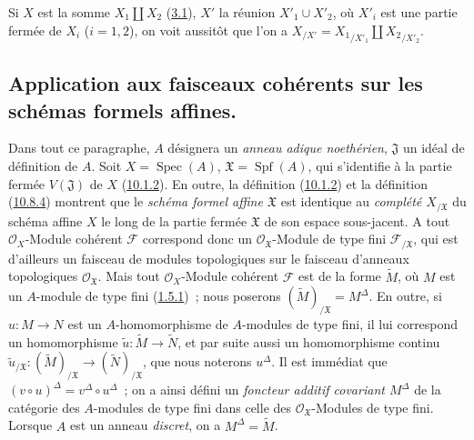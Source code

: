 
\begin{remark}[10.9.10]
\label{I.10.9.10-fr}
Si $X$ est la somme $X_1\amalg X_2$
(\hyperref[subsection:I.3.1-fr]{3.1}), $X'$ la réunion
$X'_1\cup X'_2$, où $X'_i$ est une partie fermée de $X_i$ ($i=1,2$),
on voit aussitôt que l'on a
$X_{/X'}={X_1}_{/X'_1}\amalg {X_2}_{/X'_2}$.
\end{remark}

\subsection{Application aux faisceaux cohérents sur les schémas formels
affines.}
\label{subsection:I.10.10-fr}

\begin{env}[10.10.1]
\label{I.10.10.1-fr}
Dans tout ce paragraphe, $A$ désignera un \emph{anneau adique
noethérien}, $\mathfrak{J}$ un idéal de définition de $A$. Soit
$X=\operatorname{Spec}(A)$, $\mathfrak{X}=\operatorname{Spf}(A)$, qui
s'identifie à la partie fermée $V(\mathfrak{J})$ de $X$
(\hyperref[I.10.1.2-fr]{10.1.2}). En outre, la définition
(\hyperref[I.10.1.2-fr]{10.1.2}) et la définition
(\hyperref[I.10.8.4-fr]{10.8.4}) montrent que le
\emph{schéma formel affine $\mathfrak{X}$} est identique au
\emph{complété $X_{/\mathfrak{X}}$} du schéma affine $X$ le long de la
partie fermée $\mathfrak{X}$ de son espace sous-jacent. A tout
$\mathscr{O}_X$-Module cohérent $\mathscr{F}$ correspond donc un
$\mathscr{O}_{\mathfrak{X}}$-Module de type fini
$\mathscr{F}_{/\mathfrak{X}}$, qui est d'ailleurs un faisceau de modules
topologiques sur le faisceau d'anneaux topologiques
$\mathscr{O}_{\mathfrak{X}}$. Mais tout $\mathscr{O}_X$-Module cohérent
$\mathscr{F}$ est de la forme $\widetilde M$, où $M$ est un $A$-module
de type fini (\hyperref[I.1.5.1-fr]{1.5.1})~; nous poserons
$(\widetilde M)_{/\mathfrak{X}}=M^\Delta$. En outre, si $u:M\to N$ est
un $A$-homomorphisme de $A$-modules de type fini, il lui correspond un
homomorphisme $\widetilde u:\widetilde M\to\widetilde N$, et par suite
aussi un homomorphisme continu
$\widetilde u_{/\mathfrak{X}}:(\widetilde M)_{/\mathfrak{X}}\to
(\widetilde N)_{/\mathfrak{X}}$, que nous noterons $u^\Delta$. Il est
immédiat que
$(v\circ u)^\Delta=v^\Delta\circ u^\Delta$~; on a ainsi défini un
\emph{foncteur additif covariant $M^\Delta$} de la catégorie des
$A$-modules de type fini dans celle des
$\mathscr{O}_{\mathfrak{X}}$-Modules de type fini. Lorsque $A$ est un
anneau \emph{discret}, on a $M^\Delta=\widetilde M$.
\end{env}

